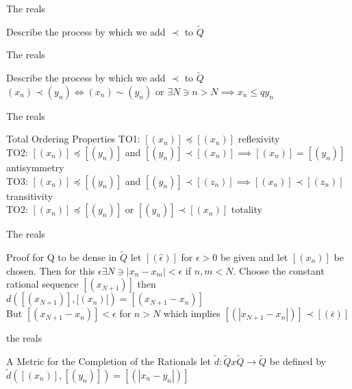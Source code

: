 \documentclass{beamer}
\begin{document}
\begin{frame}{The reals}
        \begin{block}{Describe the process by which we add $\prec$ to $\widetilde{Q}$}
        \end{block}
\end{frame}

\begin{frame}{The reals}
        \begin{block}{Describe the process by which we add $\prec$ to $\widetilde{Q}$}
                $(x_n) \prec (y_n) \iff (x_n) \sim (y_n)$ or $\exists N \ni n > N \implies x_n \le
q y_n$
        \end{block}
\end{frame}

\begin{frame}{The reals}
	\begin{block}{Total Ordering Properties}
		TO1: $[(x_n)] \preceq [(x_n)]$ reflexivity\\
		TO2: $[(x_n)] \preceq [(y_n)]$ and $[(y_n)] \prec [(x_n)] \implies [(x_n)] = [(y_n)]$ antisymmetry\\
		TO3: $[(x_n)] \preceq [(y_n)]$ and $[(y_n)] \prec [(z_n)] \implies [(x_n)] \prec [(z_n)]$ transitivity\\
		TO2: $[(x_n)] \preceq [(y_n)]$ or $[(y_n)] \prec [(x_n)]$ totality
        \end{block}
\end{frame}

\begin{frame}{The reals}
	\begin{block}{Proof for Q to be dense in $\widetilde{Q}$}
		let $[(\hat{\epsilon})]$ for $\epsilon > 0$ be given and let $[(x_n)]$ be chosen. Then for this $\epsilon \exists N \ni |x_n - x_m| < \epsilon$ if $n,m < N$. Choose the constant rational sequence $[(x_{N+1})]$ then $d([(x_{N+1})],[(x_n)[) = [(x_{N+1} - x_n)]$\\
		But $[(x_{N+1} - x_n)] < \epsilon$ for $n > N$ which implies $[(|x_{N+1} - x_n|)] \prec [(\bar{\epsilon})]$
        \end{block}
\end{frame}

\begin{frame}{the reals}
        \begin{block}{A Metric for the Completion of the Rationals}
                let $\widetilde{d}: \widetilde{Q}x\tilde{Q} \rightarrow \widetilde{Q} $ be defined by $\tilde{d}([(x_n)],[(y_n)]) = [(|x_n - y_n|)]$
        \end{block}
\end{frame}
\end{document}
